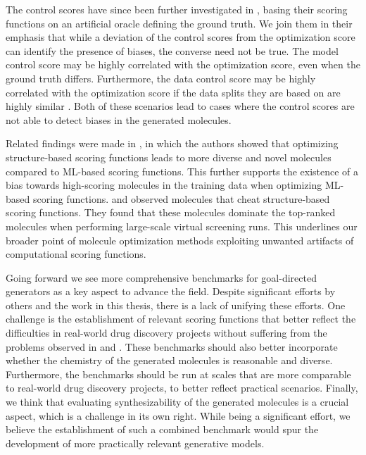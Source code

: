 The control scores have since been further investigated in \citet{gendreauMolecularAssaysSimulator2023},
basing their scoring functions on an artificial oracle defining the ground truth. We join them in
their emphasis that while a deviation of the control scores from the optimization score can identify
the presence of biases, the converse need not be true. The model control score may be highly
correlated with the optimization score, even when the ground truth differs. Furthermore, the data
control score may be highly correlated with the optimization score if the data splits they are based
on are highly similar \citep{langevinExplainingAvoidingFailure2022}. Both of these scenarios lead
to cases where the control scores are not able to detect biases in the generated molecules.

Related findings were made in \citet{thomasReevaluatingSampleEfficiency2022}, in which the authors
showed that optimizing structure-based scoring functions leads to more diverse and novel molecules
compared to \ac{ML}-based scoring functions. This further supports the existence of a bias towards
high-scoring molecules in the training data when optimizing \ac{ML}-based scoring functions.
\citet{lyuModelingExpansionVirtual2023} and \citet{wuIdentifyingArtifactsLarge2024} observed
molecules that cheat structure-based scoring functions. They found that these molecules dominate the
top-ranked molecules when performing large-scale virtual screening runs. This underlines our broader
point of molecule optimization methods exploiting unwanted artifacts of computational scoring
functions.

Going forward we see more comprehensive benchmarks for goal-directed generators as a key aspect to
advance the field. Despite significant efforts by others
\citep{brownGuacaMolBenchmarkingModels2019,polykovskiyMolecularSetsMOSES2020,gaoSynthesizabilityMoleculesProposed2020,gaoSampleEfficiencyMatters2022,thomasMolScoreScoringEvaluation2024}
and the work in this thesis, there is a lack of unifying these efforts. One challenge is the
establishment of relevant scoring functions that better reflect the difficulties in real-world drug
discovery projects \citep{fromerComputeraidedMultiobjectiveOptimization2023} without suffering from
the problems observed in  and
\citep{lyuModelingExpansionVirtual2023,wuIdentifyingArtifactsLarge2024}. These benchmarks should
also better incorporate whether the chemistry of the generated molecules is reasonable
\citep{thomasReevaluatingSampleEfficiency2022} and diverse. Furthermore, the benchmarks should be
run at scales that are more comparable to real-world drug discovery projects, to better reflect
practical scenarios. Finally, we think that evaluating synthesizability of the generated molecules
is a crucial aspect, which is a challenge in its own right. While being a significant effort, we
believe the establishment of such a combined benchmark would spur the development of more
practically relevant generative models.

